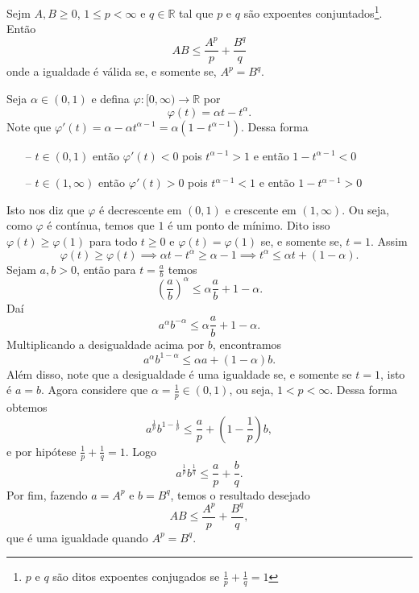 \documentclass[a4paper, 11pt]{book}
\theoremstyle{definition}
\newcommand{\bR}{\mathbb{R}}
\begin{document}
\begin{tbox} \label{thm:desigualdade-de-young}
    Sejm $A,B \geqslant 0$, $1 \leqslant p < \infty$ e $q \in \bR$ tal que $p$ e $q$ são expoentes conjuntados\footnote{$p$ e $q$ são ditos expoentes conjugados se $\frac{1}{p} + \frac{1}{q} = 1$}. Então
    \[
        AB \leqslant \frac{A^p}{p} + \frac{B^q}{q}
    \]
    onde a igualdade é válida se, e somente se, $A^p = B^q$.
\end{tbox}
\begin{prf}
    Seja $\alpha \in (0,1)$ e defina $\varphi : [0,\infty) \to \bR$ por
    \[
        \varphi(t) = \alpha t - t^{\alpha}.
    \]
    Note que $\varphi'(t) = \alpha - \alpha t^{\alpha - 1} = \alpha(1 - t^{\alpha-1})$. Dessa forma
    \begin{itemize}
        \item[--] $t \in (0,1)$ então $\varphi'(t) < 0$ pois $t^{\alpha - 1} > 1$ e então $1 - t^{\alpha - 1} < 0$
        \item[--] $t \in (1,\infty)$ então $\varphi'(t) > 0$ pois $t^{\alpha - 1} < 1$ e então $1 - t^{\alpha - 1} > 0$
    \end{itemize}
    Isto nos diz que $\varphi$ é decrescente em $(0,1)$ e crescente em $(1,\infty)$. 
    Ou seja, como $\varphi$ é contínua, temos que $1$ é um ponto de mínimo.
    Dito isso $\varphi(t) \geqslant \varphi(1)$ para todo $t \geqslant 0$ e $\varphi(t) = \varphi(1)$ se, e somente se, $t = 1$. Assim
    \[
        \varphi(t) \geqslant \varphi(t) \implies \alpha t - t^{\alpha} \geqslant \alpha - 1 \implies t^{\alpha} \leqslant \alpha t + (1 - \alpha).
    \]
    Sejam $a, b > 0$, então para $t = \frac{a}{b}$ temos
    \[
        \left( \frac{a}{b} \right)^\alpha \leqslant \alpha \frac{a}{b} + 1 - \alpha.
    \]
    Daí
    \[
        a^{\alpha} b^{-\alpha} \leqslant \alpha \frac{a}{b} + 1 - \alpha.
    \]
    Multiplicando a desigualdade acima por $b$, encontramos
    \[
        a^\alpha b^{1 - \alpha} \leqslant \alpha a + (1-\alpha)b.
    \]
    Além disso, note que a desigualdade é uma igualdade se, e somente se $t = 1$, isto é $a = b$.
    Agora considere que $\alpha = \frac{1}{p} \in (0,1)$, ou seja, $1 < p < \infty$. Dessa forma obtemos
    \[
        a^{\frac{1}{p}}b^{1 - \frac{1}{p}} \leqslant \frac{a}{p}+ \left(1 - \frac{1}{p}\right)b,
    \]
    e por hipótese $\frac{1}{p} + \frac{1}{q} = 1$. Logo
    \[
        a^{\frac{1}{p}}b^{\frac{1}{q}} \leqslant \frac{a}{p} + \frac{b}{q}.
    \]
    Por fim, fazendo $a = A^p$ e $b = B^q$, temos o resultado desejado
    \[
        AB \leqslant \frac{A^p}{p} + \frac{B^q}{q},
    \]
    que é uma igualdade quando $A^p = B^q$.
\end{prf}
\end{document}
